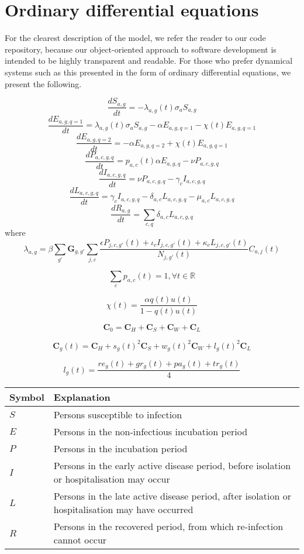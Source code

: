 
\section{Ordinary differential equations}

For the clearest description of the model, we refer the reader to our code repository, because our object-oriented approach to software development is intended to be highly transparent and readable. For those who prefer dynamical systems such as this presented in the form of ordinary differential equations, we present the following.

\[\frac{dS_{a,g}}{dt}=-\lambda_{a,g}(t) \sigma_{a} S_{a,g}\]
\[\frac{dE_{a,g,q=1}}{dt}=\lambda_{a,g}(t) \sigma_{a} S_{a,g} -\alpha E_{a,g,q=1} - \chi(t) E_{a,g,q=1} \]
\[\frac{dE_{a,g,q=2}}{dt}=-\alpha E_{a,g,q=2} + \chi(t) E_{a,g,q=1} \]
\[\frac{dP_{a,c,g,q}}{dt}=p_{a,c}(t) \alpha E_{a,g,q}-\nu P_{a,c,g,q}\]
\[\frac{dI_{a,c,g,q}}{dt}=\nu P_{a,c,g,q}-\gamma_{c}I_{a,c,g,q}\]
\[\frac{dL_{a,c,g,q}}{dt}=\gamma_{c}I_{a,c,g,q}-\delta_{a,c}L_{a,c,g,q}-\mu_{a,c}L_{a,c,g,q}\]
\[\frac{dR_{a,g}}{dt}=\sum_{c,q}{}\delta_{a,c}L_{a,c,g,q}\]
where
\[\lambda_{a,g}=\beta \sum_{g'}\textbf{G}_{g,g'} \sum_{j,c}\frac{\epsilon P_{j,c,g'}(t)+\iota_{c}I_{j,c,g'}(t)+\kappa_{c}L_{j,c,g'}(t)}{N_{j,g'}(t)} C_{a,j}(t)\]

\[\sum_{c}p_{a,c}(t)=1,\forall t\in\mathbb{R}\]

\[\chi(t) = \frac{\alpha q(t) u(t)}{1 - q(t) u(t)}\]

\[\textbf{C}_{0}=\textbf{C}_{H}+\textbf{C}_{S}+\textbf{C}_{W}+\textbf{C}_{L}\]

\[\textbf{C}_{g}(t)=\textbf{C}_{H}+s_{g}(t)^{2}\textbf{C}_{S}+w_{g}(t)^{2}\textbf{C}_{W}+l_{g}(t)^{2}\textbf{C}_{L}\]

\[l_{g}(t)=\frac{re_{g}(t)+gr_{g}(t)+pa_{g}(t)+tr_{g}(t)}{4}\]

\begin{table}[ht]
\renewcommand{\baselinestretch}{1}
    	\begin{tabular}{| p{2cm} | p{11.1cm} |}
    	\hline
    		Symbol & Explanation \\
	    	\hline
	    	$S$ & Persons susceptible to infection \\
    		$E$ & Persons in the non-infectious incubation period \\
    		$P$ & Persons in the incubation period \\
    		$I$ & Persons in the early active disease period, before isolation or hospitalisation may occur \\
    		$L$ & Persons in the late active disease period, after isolation or hospitalisation may have occurred \\
    		$R$ & Persons in the recovered period, from which re-infection cannot occur \\
    		\hline
	\end{tabular}
\end{table}


